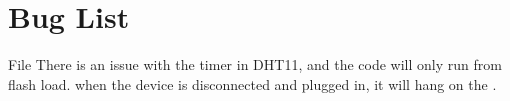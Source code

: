 \chapter{Bug List}
\hypertarget{bug}{}\label{bug}

\begin{DoxyRefList}
\item[File \doxylink{_d_h_t_8c}{DHT.c} ]\label{bug__bug000001}%
%
There is an issue with the timer in DHT11, and the code will only run from flash load. when the device is disconnected and plugged in, it will hang on the .
\end{DoxyRefList}